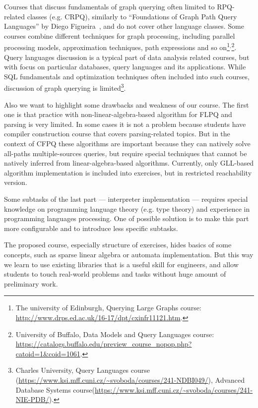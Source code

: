 \documentclass[sigconf]{acmart}
\begin{document}
Courses that discuss fundamentals of graph querying often limited to RPQ-related classes (e.g. CRPQ), similarly to ``Foundations of Graph Path Query Languages'' by Diego Figueira~\cite{Figueira2022}, and do not cover other language classes. 
Some courses combine different techniques for graph processing, including parallel processing models, approximation techniques, path expressions and so on\footnote{The university of Edinburgh, Querying Large Graphs course: \url{http://www.drps.ed.ac.uk/16-17/dpt/cxinfr11121.htm}.}$^{,}$\footnote{University of Buffalo, Data Models and Query Languages course: \url{https://catalogs.buffalo.edu/preview_course_nopop.php?catoid=1&coid=1061}.}.
Query languages discussion is a typical part of data analysis related courses, but with focus on particular databases, query languages and its applications.
While SQL fundamentals and optimization techniques often included into such courses, discussion of graph querying is limited\footnote{Charles University, Query Languages course (\url{https://www.ksi.mff.cuni.cz/~svoboda/courses/241-NDBI049/}), Advanced Database Systems course(\url{https://www.ksi.mff.cuni.cz/~svoboda/courses/241-NIE-PDB/}).}.


Also we want to highlight some drawbacks and weakness of our course.
The first one is that practice with non-linear-algebra-based algorithm for FLPQ and parsing is very limited. 
In some cases it is not a problem because students have compiler construction course that covers parsing-related topics.
But in the context of CFPQ these algorithms are important because they can natively solve all-paths multiple-sources queries, but require special techniques that cannot be natively inferred from linear-algebra-based algorithms.
Currently, only GLL-based algorithm implementation is included into exercises, but in restricted reachability version.

Some subtasks of the last part --- interpreter implementation --- requires special knowledge on programming language theory (e.g. type theory) and experience in programming languages processing.
One of possible solution is to make this part more configurable and to introduce less specific subtasks.

The proposed course, especially structure of exercises, hides basics of some concepts, such as sparse linear algebra or automata implementation.
But this way we learn to use existing libraries that is a useful skill for engineers, and allow students to touch real-world problems and tasks without huge amount of preliminary work.
\end{document}
